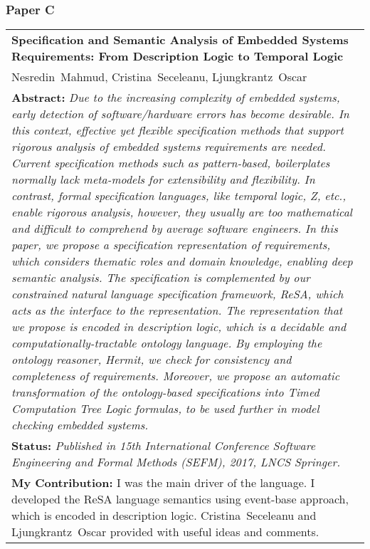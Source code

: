 \subsubsection{Paper C}
\begin{tabular}{p{\textwidth}}
\textbf{Specification and Semantic Analysis of Embedded Systems Requirements: From  Description Logic to Temporal Logic}\\%
Nesredin~Mahmud, Cristina~Seceleanu, Ljungkrantz~Oscar\\[6pt]%
\textbf{Abstract:} \textit{Due to the increasing complexity of embedded systems, early detection of software/hardware errors has become desirable. In this context, effective yet flexible specification methods that support rigorous analysis of embedded systems requirements are needed. Current specification methods such as pattern-based, boilerplates normally lack meta-models for extensibility and flexibility. In contrast, formal specification languages, like temporal logic, Z, etc., enable rigorous analysis, however, they usually are too mathematical and difficult to comprehend by average software engineers. In this paper, we propose a specification representation of requirements, which considers thematic roles and domain knowledge, enabling deep semantic analysis. The specification is complemented by our constrained natural language specification framework, ReSA, which acts as the interface to the representation. The representation that we propose is encoded in description logic, which is a decidable and computationally-tractable ontology language. By employing the ontology reasoner, Hermit, we check for consistency and completeness of requirements. Moreover, we propose an automatic transformation of the ontology-based specifications into Timed Computation Tree Logic formulas, to be used further in model checking embedded systems.}\\[6pt]%
\textbf{Status:} \textit{Published in 15th International Conference Software Engineering and Formal Methods (SEFM), 2017, LNCS Springer.}\\%
\textbf{My Contribution: } I was the main driver of the language. I developed the ReSA language semantics using event-base approach, which is encoded in description logic. Cristina~Seceleanu and Ljungkrantz~Oscar provided with useful ideas and comments.\\%
\end{tabular}

